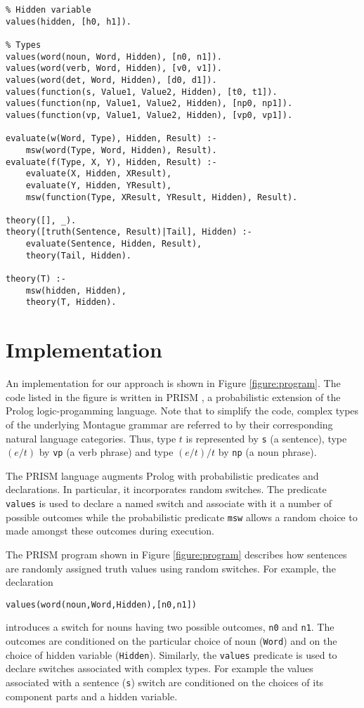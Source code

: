\documentclass[letterpaper]{article}
\begin{document}
\begin{figure*}
\centering
\begin{lstlisting}
% Hidden variable
values(hidden, [h0, h1]).

% Types
values(word(noun, Word, Hidden), [n0, n1]).
values(word(verb, Word, Hidden), [v0, v1]).
values(word(det, Word, Hidden), [d0, d1]).
values(function(s, Value1, Value2, Hidden), [t0, t1]).
values(function(np, Value1, Value2, Hidden), [np0, np1]).
values(function(vp, Value1, Value2, Hidden), [vp0, vp1]).

evaluate(w(Word, Type), Hidden, Result) :-
	msw(word(Type, Word, Hidden), Result).
evaluate(f(Type, X, Y), Hidden, Result) :-
	evaluate(X, Hidden, XResult),
	evaluate(Y, Hidden, YResult),
	msw(function(Type, XResult, YResult, Hidden), Result).

theory([], _).
theory([truth(Sentence, Result)|Tail], Hidden) :-
	evaluate(Sentence, Hidden, Result),
	theory(Tail, Hidden).

theory(T) :-
	msw(hidden, Hidden),
	theory(T, Hidden).
\end{lstlisting}
\caption{A PRISM program describing probability distributions over
  natural language models used for our examples.}
\label{figure:program}
\end{figure*}


\section{Implementation}


An implementation for our approach is shown in Figure 
\ref{figure:program}. The code listed in the figure is written in PRISM \cite{Sato:97}, a probabilistic extension of the Prolog logic-progamming language. Note that to simplify the code, complex types of the underlying Montague grammar are referred to by their corresponding natural language
categories. Thus, type $t$ is represented by \texttt{s} (a sentence), type $(e/t)$ by \texttt{vp} (a verb phrase) and type $(e/t)/t$ by \texttt{np} (a noun phrase). 

The PRISM language augments Prolog with probabilistic predicates and declarations. In particular, it incorporates random switches. The predicate \texttt{values} is used to declare a named switch and associate with it a number of possible outcomes while the probabilistic predicate \texttt{msw} allows a random choice to made amongst these outcomes during execution. 

The PRISM program shown in Figure \ref{figure:program} describes how sentences are randomly assigned truth values using random switches. For example, the declaration 
\begin{center}
\texttt{values(word(noun,Word,Hidden),[n0,n1])} 
\end{center}
introduces a switch for nouns having two possible outcomes, \texttt{n0} and \texttt{n1}.
The outcomes are conditioned on the particular choice of noun (\texttt{Word}) and on the choice of hidden variable (\texttt{Hidden}). Similarly, the \texttt{values} predicate is used to declare switches associated with complex types. For example the values associated with a sentence (\texttt{s}) switch are conditioned on the choices of its component parts and a hidden variable.
\end{document}
